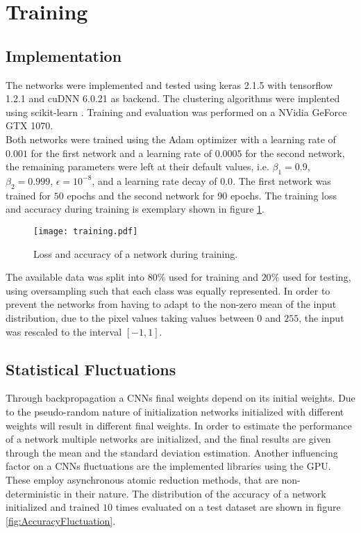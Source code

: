 \section{Training}

\subsection{Implementation}
The networks were implemented and tested using keras 2.1.5 \cite{chollet2015keras} with tensorflow 1.2.1 \cite{tensorflow2015-whitepaper} and cuDNN 6.0.21 \cite{Chetlur2014} as backend. The clustering algorithms were implented using scikit-learn \cite{scikit-learn}. Training and evaluation was performed on a NVidia GeForce GTX 1070.\\

Both networks were trained using the Adam optimizer with a learning rate of $0.001$ for the first network and a learning rate of $0.0005$ for the second network, the remaining parameters were left at their default values, i.e. $\beta_1=0.9$, $\beta_2=0.999$, $\epsilon=10^{-8}$, and a learning rate decay of $0.0$. The first network was trained for $50$ epochs and the second network for $90$ epochs. The training loss and accuracy during training is exemplary shown in figure \ref{fig:Training}. \\

\begin{figure}
\centering
\texttt{[image: training.pdf]}
\caption{Loss and accuracy of a network during training.}
\label{fig:Training}
\end{figure}

The available data was split into $80\%$ used for training and $20\%$ used for testing, using oversampling such that each class was equally represented. In order to prevent the networks from having to adapt to the non-zero mean of the input distribution, due to the pixel values taking values between $0$ and $255$, the input was rescaled to the interval $[-1,1]$. \\

\subsection{Statistical Fluctuations}

Through backpropagation a CNNs final weights depend on its initial weights. Due to the pseudo-random nature of initialization networks initialized with different weights will result in different final weights. In order to estimate the performance of a network multiple networks are initialized, and the final results are given through the mean and the standard deviation estimation. Another influencing factor on a CNNs fluctuations are the implemented libraries using the GPU. These employ asynchronous atomic reduction methods, that are non-deterministic in their nature. The distribution of the accuracy of a network initialized and trained $10$ times evaluated on a test dataset are shown in figure \ref{fig:AccuracyFluctuation}.

